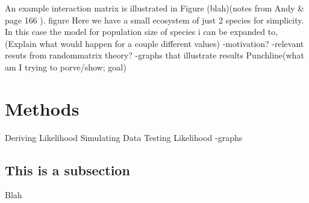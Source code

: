 \documentclass{article}
\begin{document}
An example interaction matrix is illustrated in Figure (blah)(notes from Andy & page 166 ).\hfill\break 
\hfill\break figure \hfill\break \hfill\break
Here we have a small ecosystem of just 2 species for simplicity. In this case the model for population size of species i can be expanded to, 
\hfill\break
\hfill\break
\hfill\break
\hfill\break
(Explain what would happen for a couple different values)\hfill\break
-motivation?\hfill\break
-relevant resuts from randommatrix theory?\hfill\break
-graphs that illustrate results\hfill\break
Punchline(what am I trying to porve/show; goal)

\section{Methods}
Deriving Likelihood\hfill\break
Simulating Data\hfill\break
Testing Likelihood\hfill\break
-graphs\hfill\break
\hfill\break
\subsection{This is a subsection}
Blah
\hfill\break

\hfill\break
\end{document}
